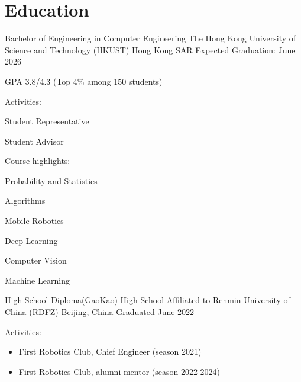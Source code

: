 \vspace{-\acvSectionTopSkip}
\section{Education}
\cventry
{Bachelor of Engineering in Computer Engineering} %
{The Hong Kong University of Science and Technology (HKUST)} %
{Hong Kong SAR} %
{Expected Graduation: June 2026} %
\begin{cvitems}
    \item {GPA 3.8/4.3 (Top 4\% among 150 students)}
    \item {Activities:}
        \begin{itemize}
            \begin{multicols}{2}
                \item Student Representative
                \item Student Advisor
            \end{multicols}
        \end{itemize}
    \item {Course highlights:}
        \begin{itemize}
            \begin{multicols}{2}
                \item Probability and Statistics
                \item Algorithms
                \item Mobile Robotics
                \item Deep Learning
                \item Computer Vision
                \item Machine Learning
            \end{multicols}
        \end{itemize}
\end{cvitems}

\cventry
{High School Diploma(GaoKao)} %
{High School Affiliated to Renmin University of China (RDFZ)} %
{Beijing, China} %
{Graduated June 2022} %
\begin{cvitems}
\item {Activities:}
\begin{itemize}
    \item First Robotics Club, Chief Engineer (season 2021)
    \item First Robotics Club, alumni mentor (season 2022-2024)
\end{itemize}
\end{cvitems}
